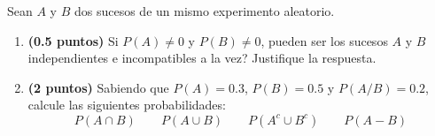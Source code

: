 
Sean $A$ y $B$ dos sucesos de un mismo experimento aleatorio.
\begin{enumerate}[label=\alph*)]
  \item \textbf{(0.5 puntos)} Si $P(A)\neq 0$ y $P(B)\neq 0$,
  \textquestiondown{}pueden ser los sucesos $A$ y $B$ independientes e
  incompatibles a la vez? Justifique la respuesta.
  \item \textbf{(2 puntos)} Sabiendo que $P(A)=0.3$, $P(B)=0.5$ y
  $P(A/B)=0.2$, calcule las siguientes probabilidades:
  \[
  P(A\cap B)\qquad P(A\cup B)\qquad P(A^c\cup B^c)\qquad P(A-B)
  \]
\end{enumerate}
